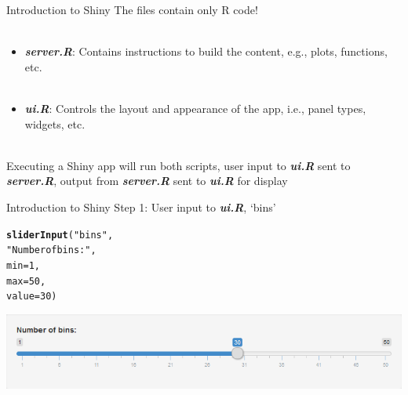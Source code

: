 \documentclass[serif]{beamer}\usepackage[]{graphicx}\usepackage[]{color}
\makeatletter
\newcommand{\hlnum}[1]{\textcolor[rgb]{0.686,0.059,0.569}{#1}}%
\newcommand{\hlstr}[1]{\textcolor[rgb]{0.192,0.494,0.8}{#1}}%
\newcommand{\hlstd}[1]{\textcolor[rgb]{0.345,0.345,0.345}{#1}}%
\newcommand{\hlkwc}[1]{\textcolor[rgb]{0.333,0.667,0.333}{#1}}%
\newcommand{\hlkwd}[1]{\textcolor[rgb]{0.737,0.353,0.396}{\textbf{#1}}}%
\newenvironment{kframe}{%
 \def\at@end@of@kframe{}%
 \ifinner\ifhmode%
  \def\at@end@of@kframe{\end{minipage}}%
  \begin{minipage}{\columnwidth}%
 \fi\fi%
 \def\FrameCommand##1{\hskip\@totalleftmargin \hskip-\fboxsep
 \colorbox{shadecolor}{##1}\hskip-\fboxsep
     \hskip-\linewidth \hskip-\@totalleftmargin \hskip\columnwidth}%
 \MakeFramed {\advance\hsize-\width
   \@totalleftmargin\z@ \linewidth\hsize
   \@setminipage}}%
 {\par\unskip\endMakeFramed%
 \at@end@of@kframe}
\newcommand{\emtxt}[1]{\textbf{\textit{#1}}}
\makeatother
\begin{document}
\begin{frame}[t]{Introduction to Shiny}
The files contain only R code! \\~\\
\begin{itemize}
\item \emtxt{server.R}: Contains instructions to build the content, e.g., plots, functions, etc.\\~\\
\item \emtxt{ui.R}: Controls the layout and appearance of the app, i.e., panel types, widgets, etc. \\~\\
\end{itemize}
Executing a Shiny app will run both scripts, user input to \emtxt{ui.R} sent to \emtxt{server.R}, output from \emtxt{server.R} sent to \emtxt{ui.R} for display
\end{frame}

\begin{frame}[t, fragile]{Introduction to Shiny}
Step 1: User input to \emtxt{ui.R}, `bins'
\small
\begin{kframe}
\begin{alltt}
\hlkwd{sliderInput}\hlstd{(}\hlstr{"bins"}\hlstd{,}
            \hlstr{"Number of bins:"}\hlstd{,}
            \hlkwc{min} \hlstd{=} \hlnum{1}\hlstd{,}
            \hlkwc{max} \hlstd{=} \hlnum{50}\hlstd{,}
            \hlkwc{value} \hlstd{=} \hlnum{30}\hlstd{)}
\end{alltt}
\end{kframe}
\begin{center}
\includegraphics[width = \textwidth]{fig/sliderinput.png}
\end{center}
\end{frame}
\end{document}
